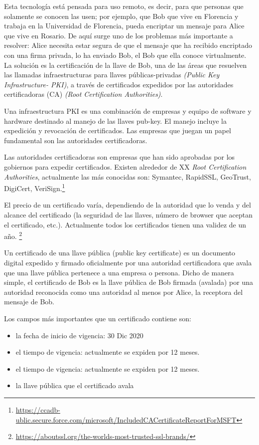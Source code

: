 \documentclass[12pt]{report} %
\begin{document}
Esta tecnología está pensada para uso remoto, es decir, para que personas que solamente se conocen las usen; por ejemplo, que Bob que vive en Florencia y trabaja en la Universidad de Florencia, pueda encriptar un mensaje para Alice que vive en Rosario. De aquí surge uno de los problemas más importante a resolver: Alice necesita estar segura de que el mensaje que ha recibido encriptado con una firma privada, lo ha enviado Bob, el Bob que ella conoce virtualmente. La solución es la certificación de la llave de Bob, una de las áreas que resuelven las llamadas infraestructuras para llaves públicas-privadas \textit{(Public Key Infrastructure- PKI)}, a través de certificados expedidos por las autoridades certificadoras (CA) \textit{(Root Certification Authorities)}.

Una infraestructura PKI  es una combinación de  empresas y equipo de software y hardware destinado al manejo de las llaves pub-key. El manejo incluye la expedición y revocación de certificados. Las empresas que juegan un papel fundamental son las autoridades certificadoras.

Las autoridades certificadoras son empresas que han sido aprobadas por los gobiernos para expedir certificados. Existen alrededor de XX \textit{Root Certification Authorities}, actualmente las más conocidas son: Symantec,  RapidSSL,  GeoTrust, DigiCert, VeriSign.\footnote{\url{https://ccadb-ublic.secure.force.com/microsoft/IncludedCACertificateReportForMSFT}}

El precio de un certificado varía, dependiendo de la autoridad que lo venda y del alcance del certificado (la seguridad de las llaves, número de browser que aceptan el certificado, etc.). Actualmente todos los certificados tienen una validez de un año. \footnote{\url{ https://aboutssl.org/the-worlds-most-trusted-ssl-brands/}}

Un certificado de una llave pública (public key certificate) es un documento digital expedido y firmado oficialmente por una autoridad certificadora que avala que una llave pública pertenece a una empresa o persona.  Dicho de manera simple, el certificado de Bob es la llave pública de Bob firmada (avalada) por una autoridad reconocida como una autoridad al menos por Alice, la receptora del mensaje de Bob.

Los campos más importantes que un certificado contiene son:

\begin{itemize}
    \item la fecha de inicio de vigencia: 30 Dic 2020
    \item el tiempo de vigencia: actualmente se expiden por 12 meses.
    \item el tiempo de vigencia: actualmente se expiden por 12 meses.
    \item la llave pública que el certificado avala
\end{itemize}
\end{document}
